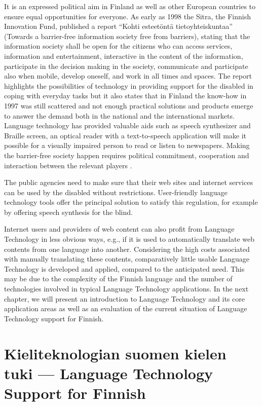\documentclass[]{../../metanetpaper}
\begin{document}
\begin{Parallel}[c]{70mm}{70mm}
{It is an expressed political aim in Finland as well as other European
countries to ensure equal opportunities for everyone. As early as 1998
the Sitra, the Finnish Innovation Fund, published a report “Kohti
esteetöntä tietoyhteiskuntaa” (Towards a barrier-free information
society free from barriers), stating that the information society
shall be open for the citizens who can access services, information
and entertainment, interactive in the content of the information,
participate in the decision making in the society, communicate and
participate also when mobile, develop oneself, and work in all times
and spaces. The report highlights the possibilities of technology in
providing support for the disabled in coping with everyday tasks but
it also states that in Finland the know-how in 1997 was still
scattered and not enough practical solutions and products emerge to
answer the demand both in the national and the international
markets. Language technology has provided valuable aids such as speech
synthesizer and Braille screen, an optical reader with a
text-to-speech application will make it possible for a visually
impaired person to read or listen to newspapers. Making the
barrier-free society happen requires political commitment, cooperation
and interaction between the relevant players \cite{Sitra1998}.

The public agencies need to make sure that their web sites and internet
services can be used by the disabled without restrictions. User-friendly
language technology tools offer the principal solution to satisfy this
regulation, for example by offering speech synthesis for the blind.

Internet users and providers of web content can also profit from
Language Technology in less obvious ways, e.g., if it is used to
automatically translate web contents from one language into
another. Considering the high costs associated with manually
translating these contents, comparatively little usable Language
Technology is developed and applied, compared to the anticipated
need. This may be due to the complexity of the Finnish language and
the number of technologies involved in typical Language Technology
applications. In the next chapter, we will present an introduction to
Language Technology and its core application areas as well as an
evaluation of the current situation of Language Technology support for
Finnish.
}

\ParallelPar

\section{Kieliteknologian suomen kielen tuki --- Language Technology Support for Finnish}


\end{Parallel}
\end{document}
